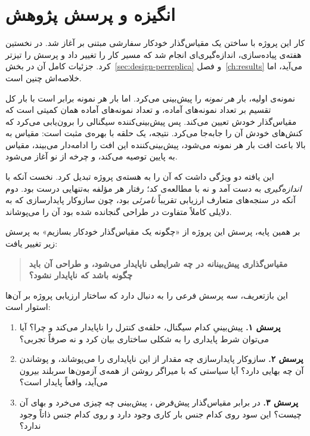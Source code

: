 \section{انگیزه و پرسش پژوهش}
\label{sec:intro-question}

کار این پروژه با ساختن یک مقیاس‌گذار خودکار سفارشی مبتنی بر  آغاز شد. در
نخستین هفته‌ی پیاده‌سازی، اندازه‌گیری‌ای انجام شد که مسیر کار را تغییر داد و پرسش را
تیزتر کرد. جزئیات کامل آن در بخش~\ref{sec:design-perreplica} و فصل~\ref{ch:results} می‌آید،
اما خلاصه‌اش چنین است.

نمونه‌ی اولیه، بار \emph{هر نمونه} را پیش‌بینی می‌کرد. اما بار هر نمونه برابر است با بار کل
تقسیم بر تعداد نمونه‌های آماده، و تعداد نمونه‌های آماده همان کمیتی است که مقیاس‌گذار خودش
تعیین می‌کند. پس پیش‌بینی‌کننده سیگنالی را برون‌یابی می‌کرد که کنش‌های خودش آن را جابه‌جا
می‌کرد. نتیجه، یک حلقه با بهره‌ی مثبت است: مقیاس به بالا باعث افت بار هر نمونه می‌شود،
پیش‌بینی‌کننده این افت را ادامه‌دار می‌بیند، مقیاس به پایین توصیه می‌کند، و چرخه از نو آغاز
می‌شود.

این یافته دو ویژگی داشت که آن را به هسته‌ی پروژه تبدیل کرد. نخست آنکه با \emph{اندازه‌گیری}
به دست آمد و نه با مطالعه‌ی کد؛ رفتار هر مؤلفه به‌تنهایی درست بود. دوم آنکه در سنجه‌های
متعارف ارزیابی تقریباً \emph{نامرئی} بود، چون سازوکار پایدارسازی \mdash{} که به دلایلی کاملاً متفاوت در طراحی گنجانده شده بود \mdash{} آن را می‌پوشاند.

بر همین پایه، پرسش این پروژه از «چگونه یک مقیاس‌گذار خودکار بسازیم» به پرسش زیر تغییر یافت:

\begin{quote}
\textbf{مقیاس‌گذاری پیش‌بینانه در چه شرایطی ناپایدار می‌شود، و طراحی آن باید چگونه باشد که
ناپایدار نشود؟}
\end{quote}

این بازتعریف، سه پرسش فرعی را به دنبال دارد که ساختار ارزیابی پروژه بر آن‌ها استوار است:

\begin{enumerate}
  \item \textbf{پرسش ۱.} پیش‌بینیِ کدام سیگنال، حلقه‌ی کنترل را ناپایدار می‌کند و چرا؟ آیا
  می‌توان شرط پایداری را به شکلی ساختاری بیان کرد و نه صرفاً تجربی؟
  \item \textbf{پرسش ۲.} سازوکار پایدارسازی چه مقدار از این ناپایداری را می‌پوشاند، و پوشاندن
  آن چه بهایی دارد؟ آیا سیاستی که با میراگر روشن از همه‌ی آزمون‌ها سربلند بیرون می‌آید،
  واقعاً پایدار است؟
  \item \textbf{پرسش ۳.} در برابر مقیاس‌گذار پیش‌فرض ، پیش‌بینی چه چیزی
  می‌خرد و بهای آن چیست؟ این سود روی کدام جنس بار کاری وجود دارد و روی کدام جنس ذاتاً وجود
  ندارد؟
\end{enumerate}

